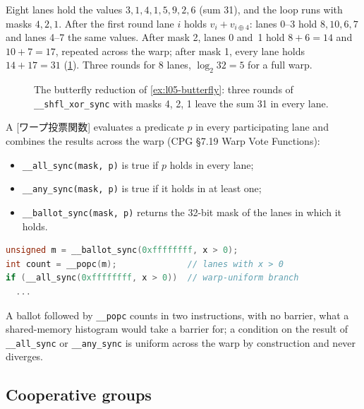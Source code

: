 \documentclass[../main.tex]{subfiles}
\begin{document}
\begin{example}
  \label{ex:l05-butterfly}
  Eight lanes hold the values $3, 1, 4, 1, 5, 9, 2, 6$ (sum 31), and the
  loop runs with masks $4, 2, 1$.  After the first round lane $i$ holds
  $v_i + v_{i \oplus 4}$: lanes 0--3 hold $8, 10, 6, 7$ and lanes 4--7
  the same values.  After mask 2, lanes 0 and~1 hold $8 + 6 = 14$ and
  $10 + 7 = 17$, repeated across the warp; after mask 1, every lane holds
  $14 + 17 = 31$ (\cref{fig:l05-butterfly}).  Three rounds for 8 lanes,
  $\log_2 32 = 5$ for a full warp.
\end{example}

\begin{figure}[tb]
  \centering
  
  \caption{The butterfly reduction of \cref{ex:l05-butterfly}: three
    rounds of \texttt{\_\_shfl\_xor\_sync} with masks 4, 2, 1 leave the
    sum 31 in every lane.}
  \label{fig:l05-butterfly}
\end{figure}

\begin{definition}
  A [ワープ投票関数] evaluates a predicate $p$
  in every participating lane and combines the results across the warp
  (CPG §7.19 Warp Vote Functions):
  \begin{itemize}
    \item \texttt{\_\_all\_sync(mask, p)} is true if $p$ holds in every
      lane;
    \item \texttt{\_\_any\_sync(mask, p)} is true if it holds in at
      least one;
    \item \texttt{\_\_ballot\_sync(mask, p)} returns the 32-bit mask of
      the lanes in which it holds.
  \end{itemize}
\end{definition}

\begin{lstlisting}[language=C++, numbers=none]
unsigned m = __ballot_sync(0xffffffff, x > 0);
int count = __popc(m);              // lanes with x > 0
if (__all_sync(0xffffffff, x > 0))  // warp-uniform branch
  ...
\end{lstlisting}
A ballot followed by \texttt{\_\_popc} counts in two instructions, with
no barrier, what a shared-memory histogram would take a barrier for; a condition on the
result of \texttt{\_\_all\_sync} or \texttt{\_\_any\_sync} is uniform
across the warp by construction and never diverges.

\subsection{Cooperative groups}
\end{document}
